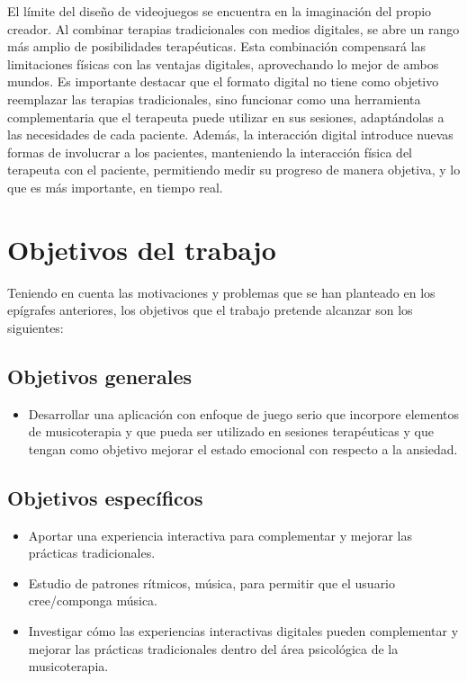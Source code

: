El límite del diseño de videojuegos se encuentra en la imaginación del propio creador. Al combinar terapias tradicionales con medios digitales, se abre un rango más amplio de posibilidades terapéuticas. Esta combinación compensará las limitaciones físicas con las ventajas digitales, aprovechando lo mejor de ambos mundos. Es importante destacar que el formato digital no tiene como objetivo reemplazar las terapias tradicionales, sino funcionar como una herramienta complementaria que el terapeuta puede utilizar en sus sesiones, adaptándolas a las necesidades de cada paciente. Además, la interacción digital introduce nuevas formas de involucrar a los pacientes, manteniendo la interacción física del terapeuta con el paciente, permitiendo medir su progreso de manera objetiva, y lo que es más importante, en tiempo real.

\section{Objetivos del trabajo}

Teniendo en cuenta las motivaciones y problemas que se han planteado en los epígrafes anteriores, los objetivos que el trabajo pretende alcanzar son los siguientes:

\subsection{Objetivos generales}

\begin{itemize}
	
	\item Desarrollar una aplicación con enfoque de juego serio que incorpore elementos de musicoterapia y que pueda ser utilizado en sesiones terapéuticas y que tengan como objetivo mejorar el estado emocional con respecto a la ansiedad.
\end{itemize}

\subsection{Objetivos específicos}

\begin{itemize}
	\item Aportar una experiencia interactiva para complementar y mejorar las prácticas tradicionales.
	\item Estudio de patrones rítmicos, música, para permitir que el usuario cree/componga música.
	\item Investigar cómo las experiencias interactivas digitales pueden complementar y mejorar las prácticas tradicionales dentro del área psicológica de la musicoterapia.
\end{itemize}